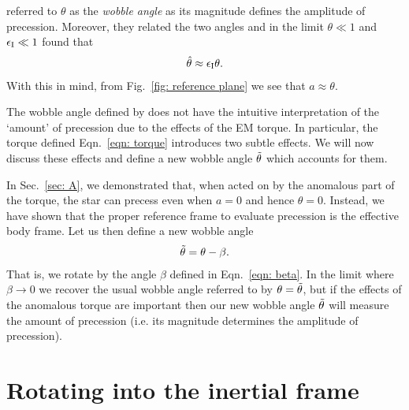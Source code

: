 \documentclass[../full_thesis/full_thesis.tex]{subfiles}
\begin{document}
\citet{Jones2001} referred to $\theta$ as the \emph{wobble angle} as its
magnitude defines the amplitude of precession. Moreover, they related the two
angles and in the limit $\theta \ll 1$ and $\epsilon_{\mathrm{I}} \ll 1$ found that
\begin{align}
\hat{\theta} \approx \epsilon_{\mathrm{I}}\theta.
\label{eqn: theta hat theta}
\end{align}
With this in mind, from Fig.~\ref{fig: reference plane} we see that $a\approx
\theta$.

The wobble angle defined by \citet{Jones2001} does not have the intuitive
interpretation of the `amount' of precession due to the effects of the EM
torque.  In particular, the torque defined Eqn.~\eqref{eqn: torque} introduces
two subtle effects. We will now discuss these effects and define a new wobble
angle $\tilde{\theta}$ which accounts for them.

In Sec.~\ref{sec: A}, we demonstrated that, when acted on by the anomalous part
of the torque, the star can precess even when $a=0$ and hence $\theta=0$.
Instead, we have shown that the proper reference frame to evaluate precession is the
effective body frame. Let us then define a new wobble angle
\begin{align}
\tilde{\theta} = \theta - \beta.
\label{eqn: wobble angle}
\end{align}
That is, we rotate by the angle $\beta$ defined in Eqn.~\eqref{eqn: beta}. In
the limit where $\beta \rightarrow 0$ we recover the usual wobble angle referred
to by \citet{Jones2001} $\theta = \tilde{\theta}$, but if the effects of the
anomalous torque are important then our new wobble angle $\tilde{\theta}$ will
measure the amount of precession (i.e. its magnitude determines the amplitude
of precession).

\section{Rotating into the inertial frame}
\end{document}
